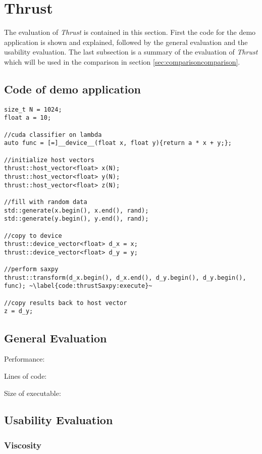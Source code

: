 \section{Thrust}
The evaluation of \textit{Thrust} is contained in this section. First the code for the demo application is shown and explained, followed by the general evaluation and the usability evaluation. The last subsection is a summary of the evaluation of \textit{Thrust} which will be used in the comparison in section \ref{sec:comparisoncomparison}.

\subsection{Code of demo application}

\begin{lstlisting}[caption={\textit{Thrust} \textit{SAXPY} example.}, label={code:thrustSaxpy}]
size_t N = 1024;
float a = 10;

//cuda classifier on lambda
auto func = [=]__device__(float x, float y){return a * x + y;};

//initialize host vectors
thrust::host_vector<float> x(N);
thrust::host_vector<float> y(N);
thrust::host_vector<float> z(N);

//fill with random data
std::generate(x.begin(), x.end(), rand);
std::generate(y.begin(), y.end(), rand);

//copy to device
thrust::device_vector<float> d_x = x;
thrust::device_vector<float> d_y = y;

//perform saxpy
thrust::transform(d_x.begin(), d_x.end(), d_y.begin(), d_y.begin(), func); ~\label{code:thrustSaxpy:execute}~

//copy results back to host vector
z = d_y;
\end{lstlisting}

\subsection{General Evaluation}

Performance: 

Lines of code: 

Size of executable: 

\subsection{Usability Evaluation}

\subsubsection[*]{Viscosity}

